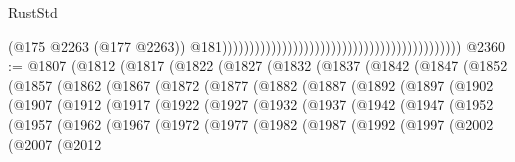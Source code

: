 \begin{lexlean}{RustStd}
\begin{coremodule}
                                                                                            (@175
                                                                                              @2263
                                                                                              (@177
                                                                                                @2263))
                                                                                            @181))))))))))))))))))))))))))))))))))))))))))))
@2360 := @1807
    (@1812
      (@1817
        (@1822
          (@1827
            (@1832
              (@1837
                (@1842
                  (@1847
                    (@1852
                      (@1857
                        (@1862
                          (@1867
                            (@1872
                              (@1877
                                (@1882
                                  (@1887
                                    (@1892
                                      (@1897
                                        (@1902
                                          (@1907
                                            (@1912
                                              (@1917
                                                (@1922
                                                  (@1927
                                                    (@1932
                                                      (@1937
                                                        (@1942
                                                          (@1947
                                                            (@1952
                                                              (@1957
                                                                (@1962
                                                                  (@1967
                                                                    (@1972
                                                                      (@1977
                                                                        (@1982
                                                                          (@1987
                                                                            (@1992
                                                                              (@1997
                                                                                (@2002
                                                                                  (@2007
                                                                                    (@2012

\end{coremodule}
\end{lexlean}
